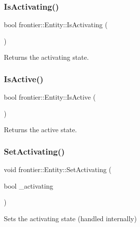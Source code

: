 \subsubsection{\texorpdfstring{Is\+Activating()}{IsActivating()}}
{\footnotesize\ttfamily bool frontier\+::\+Entity\+::\+Is\+Activating (\begin{DoxyParamCaption}{ }\end{DoxyParamCaption})}



Returns the activating state. 

\mbox{\label{classfrontier_1_1_entity_a18ff08281282ad84e50678009ba7d5f8}} 
\subsubsection{\texorpdfstring{Is\+Active()}{IsActive()}}
{\footnotesize\ttfamily bool frontier\+::\+Entity\+::\+Is\+Active (\begin{DoxyParamCaption}{ }\end{DoxyParamCaption})}



Returns the active state. 

\mbox{\label{classfrontier_1_1_entity_aaa990e97d41e4c2c48d4e91247def935}} 
\subsubsection{\texorpdfstring{Set\+Activating()}{SetActivating()}}
{\footnotesize\ttfamily void frontier\+::\+Entity\+::\+Set\+Activating (\begin{DoxyParamCaption}\item[{bool}]{\+\_\+activating }\end{DoxyParamCaption})}



Sets the activating state (handled internally) 

\mbox{\label{classfrontier_1_1_entity_ae5fd143b1a7bd1955717c850382a0794}} 
